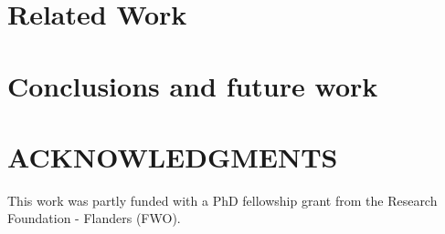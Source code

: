 \documentclass[twocolumn]{sagej}
\begin{document}
\section{Related Work}
\label{sec:5-related-work}


\section{Conclusions and future work}
\label{sec:6-conclusion}


\section*{ACKNOWLEDGMENTS}
This work was partly funded with a PhD fellowship grant from the Research Foundation - Flanders (FWO). 



\end{document}
